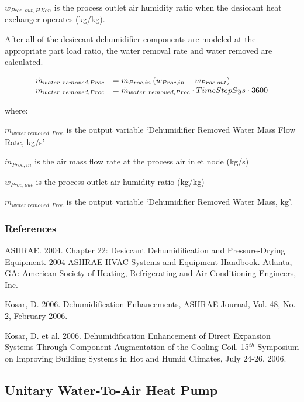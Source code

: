 \({w_{Proc,out,HXon}}\) is the process outlet air humidity ratio when the desiccant heat exchanger operates (kg/kg).

After all of the desiccant dehumidifier components are modeled at the appropriate part load ratio, the water removal rate and water removed are calculated.

\begin{equation}
  \begin{array}{rl}
    \dot{m}_{water~removed,Proc} & = \dot{m}_{Proc,in} \left(w_{Proc,in} - w_{Proc,out}\right) \\
    m_{water~removed,Proc}       & = \dot{m}_{water~removed,Proc} \cdot TimeStepSys \cdot 3600
  \end{array}
\end{equation}

where:

\({\dot{m}_{water~removed,Proc}}\) is the output variable `Dehumidifier Removed Water Mass Flow Rate, kg/s'

\({\dot{m}_{Proc,in}}\) is the air mass flow rate at the process air inlet node (kg/s)

\({w_{Proc,out}}\) is the process outlet air humidity ratio (kg/kg)

\({m_{water~removed,Proc}}\) is the output variable `Dehumidifier Removed Water Mass, kg'.

\subsubsection{References}\label{references-000}

ASHRAE. 2004. Chapter 22: Desiccant Dehumidification and Pressure-Drying Equipment. 2004 ASHRAE HVAC Systems and Equipment Handbook. Atlanta, GA: American Society of Heating, Refrigerating and Air-Conditioning Engineers, Inc.

Kosar, D. 2006. Dehumidification Enhancements, ASHRAE Journal, Vol. 48, No. 2, February 2006.

Kosar, D. et al. 2006. Dehumidification Enhancement of Direct Expansion Systems Through Component Augmentation of the Cooling Coil. 15\(^{th}\) Symposium on Improving Building Systems in Hot and Humid Climates, July 24-26, 2006.

\subsection{Unitary Water-To-Air Heat Pump}\label{unitary-water-to-air-heat-pump}

